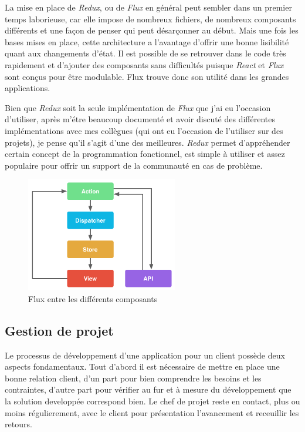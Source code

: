 \documentclass[12pt,a4paper]{article}
\begin{document}
  \bigskip

  La mise en place de \emph{Redux}, ou de \emph{Flux} en général peut
  sembler dans un premier temps laborieuse, car elle impose de nombreux
  fichiers, de nombreux composants différents et une façon de penser qui
  peut désarçonner au début. Mais une fois les bases mises en place, cette
  architecture a l'avantage d'offrir une bonne lisibilité quant aux
  changements d'état. Il est possible de se retrouver dans le code très
  rapidement et d'ajouter des composants sans difficultés puisque
  \emph{React} et \emph{Flux} sont conçus pour être modulable. Flux trouve
  donc son utilité dans les grandes applications.

  \bigskip

  Bien que \emph{Redux} soit la seule implémentation de \emph{Flux} que
  j'ai eu l'occasion d'utiliser, après m'étre beaucoup documenté et avoir
  discuté des différentes implémentations avec mes collègues (qui ont eu
  l'occasion de l'utiliser sur des projets), je pense qu'il s'agit d'une
  des meilleures. \emph{Redux} permet d'appréhender certain concept de la
  programmation fonctionnel, est simple à utiliser et assez populaire pour
  offrir un support de la communauté en cas de problème.

  \bigskip

  \begin{figure}[h]
    \centering
    \includegraphics[height=5cm]{figures/react.png}
    \caption{Flux entre les différents composants}
  \end{figure}

  \subsection{Gestion de projet}\label{gestion-de-projet}

  Le processus de développement d'une application pour un client possède
  deux aspects fondamentaux. Tout d'abord il est nécessaire de mettre en
  place une bonne relation client, d'un part pour bien comprendre les
  besoins et les contraintes, d'autre part pour vérifier au fur et à
  mesure du développement que la solution developpée correspond bien. Le
  chef de projet reste en contact, plus ou moins régulierement, avec le
  client pour présentation l'avancement et receuillir les retours.
\end{document}
